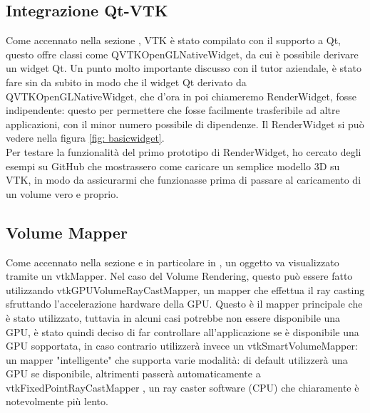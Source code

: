 \subsection{Integrazione Qt-VTK}
Come accennato nella sezione , VTK è stato compilato con il supporto a Qt, questo offre classi come QVTKOpenGLNativeWidget, da cui è possibile derivare un widget Qt. Un punto molto importante discusso con il tutor aziendale, è stato fare sin da subito in modo che il widget Qt derivato da QVTKOpenGLNativeWidget, che d'ora in poi chiameremo RenderWidget, fosse indipendente: questo per permettere che fosse facilmente trasferibile ad altre applicazioni, con il minor numero possibile di dipendenze. Il RenderWidget si può vedere nella figura \ref{fig: basicwidget}.
\\
Per testare la funzionalità del primo prototipo di RenderWidget, ho cercato degli esempi su GitHub che mostrassero come caricare un semplice modello 3D su VTK, in modo da assicurarmi che funzionasse prima di passare al caricamento di un volume vero e proprio.

\subsection{Volume Mapper}
Come accennato nella sezione  e in particolare in , un oggetto va visualizzato tramite un vtkMapper. Nel caso del Volume Rendering, questo può essere fatto utilizzando vtkGPUVolumeRayCastMapper, un mapper che effettua il ray casting sfruttando l'accelerazione hardware della GPU. Questo è il mapper principale che è stato utilizzato, tuttavia in alcuni casi potrebbe non essere disponibile una GPU, è stato quindi deciso di far controllare all'applicazione se è disponibile una GPU sopportata, in caso contrario utilizzerà invece un vtkSmartVolumeMapper: un mapper "intelligente" che supporta varie modalità: di default utilizzerà una GPU se disponibile, altrimenti passerà automaticamente a vtkFixedPointRayCastMapper , un ray caster software (CPU) che chiaramente è notevolmente più lento.

